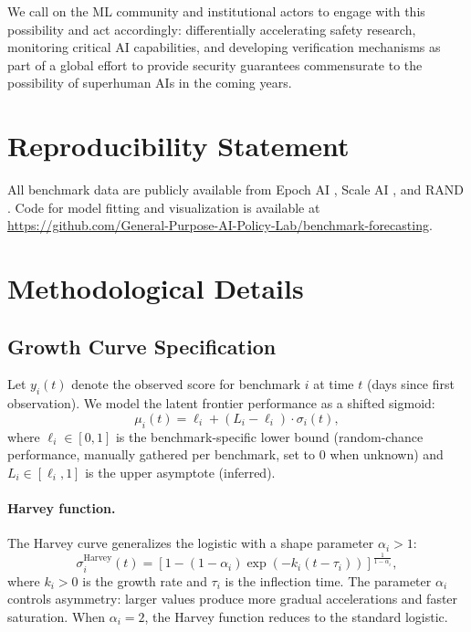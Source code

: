 \documentclass[letterpaper,twocolumn]{article}
\begin{document}
We call on the ML community and institutional actors to engage with this possibility and act accordingly: differentially accelerating safety research, monitoring critical AI capabilities, and developing verification mechanisms as part of a global effort to provide security guarantees commensurate to the possibility of superhuman AIs in the coming years.

\section*{Reproducibility Statement}

All benchmark data are publicly available from Epoch AI \citep{epoch_ai_ai_2024}, Scale AI \citep{scale_ai_introducing_2025}, and RAND \citep{dev_toward_2025}. Code for model fitting and visualization is available at \url{https://github.com/General-Purpose-AI-Policy-Lab/benchmark-forecasting}.




\appendix
\section{Methodological Details}
\label{app:methodology}

\subsection{Growth Curve Specification}

Let $y_i(t)$ denote the observed score for benchmark $i$ at time $t$ (days since first observation). We model the latent frontier performance as a shifted sigmoid:
$$\mu_i(t) = \ell_i + (L_i - \ell_i) \cdot \sigma_i(t),$$
where $\ell_i \in [0, 1]$ is the benchmark-specific lower bound (random-chance performance, manually gathered per benchmark, set to 0 when unknown) and $L_i \in [\ell_i, 1]$ is the upper asymptote (inferred).

\paragraph{Harvey function.} The Harvey curve generalizes the logistic with a shape parameter $\alpha_i > 1$:
$$\sigma_i^{\text{Harvey}}(t) = \left[1 - (1 - \alpha_i) \exp(-k_i(t - \tau_i))\right]^{\frac{1}{1-\alpha_i}},$$
where $k_i > 0$ is the growth rate and $\tau_i$ is the inflection time. The parameter $\alpha_i$ controls asymmetry: larger values produce more gradual accelerations and faster saturation. When $\alpha_i = 2$, the Harvey function reduces to the standard logistic.
\end{document}
